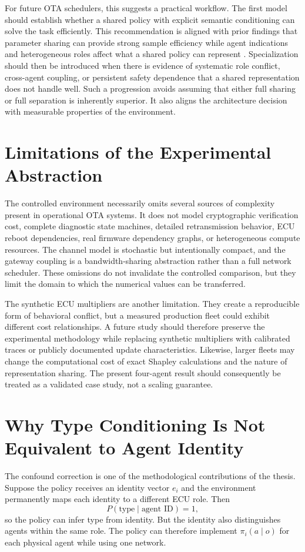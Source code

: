 \documentclass{iutbscthesis}
\begin{document}
For future OTA schedulers, this suggests a practical workflow. The first model should establish whether a shared policy with explicit semantic conditioning can solve the task efficiently. This recommendation is aligned with prior findings that parameter sharing can provide strong sample efficiency while agent indications and heterogeneous roles affect what a shared policy can represent \parencite{terry2020revisiting,terry2021pettingzoo}. Specialization should then be introduced when there is evidence of systematic role conflict, cross-agent coupling, or persistent safety dependence that a shared representation does not handle well. Such a progression avoids assuming that either full sharing or full separation is inherently superior. It also aligns the architecture decision with measurable properties of the environment.

\section{Limitations of the Experimental Abstraction}
The controlled environment necessarily omits several sources of complexity present in operational OTA systems. It does not model cryptographic verification cost, complete diagnostic state machines, detailed retransmission behavior, ECU reboot dependencies, real firmware dependency graphs, or heterogeneous compute resources. The channel model is stochastic but intentionally compact, and the gateway coupling is a bandwidth-sharing abstraction rather than a full network scheduler. These omissions do not invalidate the controlled comparison, but they limit the domain to which the numerical values can be transferred.

The synthetic ECU multipliers are another limitation. They create a reproducible form of behavioral conflict, but a measured production fleet could exhibit different cost relationships. A future study should therefore preserve the experimental methodology while replacing synthetic multipliers with calibrated traces or publicly documented update characteristics. Likewise, larger fleets may change the computational cost of exact Shapley calculations and the nature of representation sharing. The present four-agent result should consequently be treated as a validated case study, not a scaling guarantee.

\section{Why Type Conditioning Is Not Equivalent to Agent Identity}
The confound correction is one of the methodological contributions of the thesis. Suppose the policy receives an identity vector $e_i$ and the environment permanently maps each identity to a different ECU role. Then
\begin{equation}
P(\text{type}\mid\text{agent ID})=1,
\end{equation}
so the policy can infer type from identity. But the identity also distinguishes agents within the same role. The policy can therefore implement $\pi_i(a\mid o)$ for each physical agent while using one network.
\end{document}
